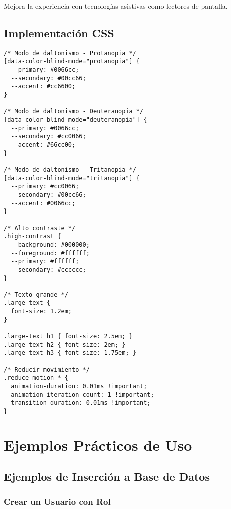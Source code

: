 \documentclass[12pt,a4paper]{article}
\begin{document}
Mejora la experiencia con tecnologías asistivas como lectores de pantalla.

\subsection{Implementación CSS}

\begin{lstlisting}[caption=Implementación de estilos de accesibilidad]
/* Modo de daltonismo - Protanopia */
[data-color-blind-mode="protanopia"] {
  --primary: #0066cc;
  --secondary: #00cc66;
  --accent: #cc6600;
}

/* Modo de daltonismo - Deuteranopia */
[data-color-blind-mode="deuteranopia"] {
  --primary: #0066cc;
  --secondary: #cc0066;
  --accent: #66cc00;
}

/* Modo de daltonismo - Tritanopia */
[data-color-blind-mode="tritanopia"] {
  --primary: #cc0066;
  --secondary: #00cc66;
  --accent: #0066cc;
}

/* Alto contraste */
.high-contrast {
  --background: #000000;
  --foreground: #ffffff;
  --primary: #ffffff;
  --secondary: #cccccc;
}

/* Texto grande */
.large-text {
  font-size: 1.2em;
}

.large-text h1 { font-size: 2.5em; }
.large-text h2 { font-size: 2em; }
.large-text h3 { font-size: 1.75em; }

/* Reducir movimiento */
.reduce-motion * {
  animation-duration: 0.01ms !important;
  animation-iteration-count: 1 !important;
  transition-duration: 0.01ms !important;
}
\end{lstlisting}

\section{Ejemplos Prácticos de Uso}

\subsection{Ejemplos de Inserción a Base de Datos}

\subsubsection{Crear un Usuario con Rol}
\end{document}
